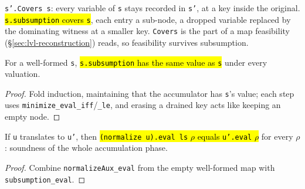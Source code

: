 \begin{definition}
\label{def:lvl-covers}
\leanok
{}
 \texttt{s'.Covers s}: every variable of \texttt{s} stays recorded in \texttt{s'}, at
a key inside the original. \hl{\texttt{s.subsumption} covers \texttt{s}}, each entry a sub-node, a
dropped variable replaced by the dominating witness at a smaller key. \texttt{Covers} is the part of a
map feasibility (\S\ref{sec:lvl-reconstruction}) reads, so feasibility survives subsumption.
\end{definition}

\begin{theorem}
\label{thm:lvl-subsumption-eval}
\leanok
{}

 For a well-formed \texttt{s}, \hl{\texttt{s.subsumption} has the same value as
\texttt{s}} under every valuation.
\end{theorem}
\begin{proof}
\leanok
{} Fold induction, maintaining that the accumulator has \texttt{s}'s value; each step uses
\texttt{minimize\_eval\_iff}/\texttt{\_le}, and erasing a drained key acts like keeping an empty node.
\end{proof}

\begin{theorem}
\label{thm:lvl-normalize-eval}
\leanok
{}
 If \texttt{u} translates to \texttt{u'}, then \hl{\texttt{(normalize u).eval ls}
$\rho$ equals \texttt{u'.eval} $\rho$} for every $\rho$: soundness of the whole accumulation phase.
\end{theorem}
\begin{proof}
\leanok
{} Combine \texttt{normalizeAux\_eval} from the empty well-formed map with
\texttt{subsumption\_eval}.
\end{proof}

